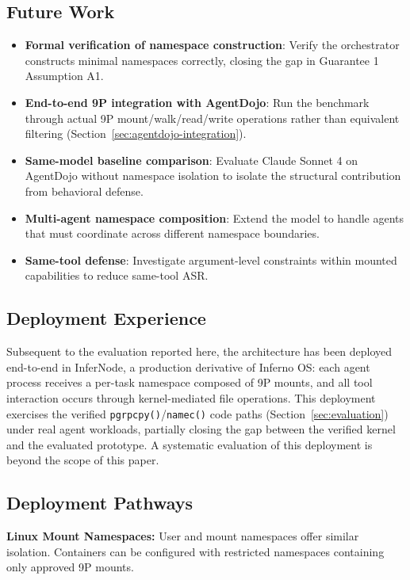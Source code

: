 \documentclass[acmsmall,screen,review]{acmart}
\begin{document}
\subsection{Future Work}

\begin{itemize}
    \item \textbf{Formal verification of namespace construction}: Verify the orchestrator constructs minimal namespaces correctly, closing the gap in Guarantee 1 Assumption A1.
    \item \textbf{End-to-end 9P integration with AgentDojo}: Run the benchmark through actual 9P mount/walk/read/write operations rather than equivalent filtering (Section~\ref{sec:agentdojo-integration}).
    \item \textbf{Same-model baseline comparison}: Evaluate Claude Sonnet 4 on AgentDojo without namespace isolation to isolate the structural contribution from behavioral defense.
    \item \textbf{Multi-agent namespace composition}: Extend the model to handle agents that must coordinate across different namespace boundaries.
    \item \textbf{Same-tool defense}: Investigate argument-level constraints within mounted capabilities to reduce same-tool ASR.
\end{itemize}

\subsection{Deployment Experience}

Subsequent to the evaluation reported here, the architecture has been deployed end-to-end in InferNode, a production derivative of Inferno OS: each agent process receives a per-task namespace composed of 9P mounts, and all tool interaction occurs through kernel-mediated file operations. This deployment exercises the verified \texttt{pgrpcpy()}/\texttt{namec()} code paths (Section~\ref{sec:evaluation}) under real agent workloads, partially closing the gap between the verified kernel and the evaluated prototype. A systematic evaluation of this deployment is beyond the scope of this paper.

\subsection{Deployment Pathways}

\textbf{Linux Mount Namespaces:} User and mount namespaces offer similar isolation. Containers can be configured with restricted namespaces containing only approved 9P mounts.
\end{document}
